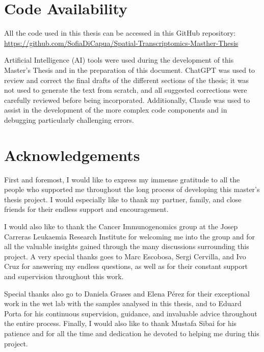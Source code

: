 \section{Code Availability}
All the code used in this thesis can be accessed in this GitHub repository:
\url{https://github.com/SofiaDiCapua/Spatial-Transcriptomics-Masther-Thesis}

Artificial Intelligence (AI) tools were used during the development of this Master’s Thesis and in the preparation of this document. ChatGPT was used to review and correct the final drafts of the different sections of the thesis; it was not used to generate the text from scratch, and all suggested corrections were carefully reviewed before being incorporated. Additionally, Claude was used to assist in the development of the more complex code components and in debugging particularly challenging errors.

\section{Acknowledgements}
First and foremost, I would like to express my immense gratitude to all the people who supported me throughout the long process of developing this master's thesis project. I would especially like to thank my partner, family, and close friends for their endless support and encouragement.

I would also like to thank the Cancer Immunogenomics group at the Josep Carreras Leukaemia Research Institute for welcoming me into the group and for all the valuable insights gained through the many discussions surrounding this project. A very special thanks goes to Marc Escobosa, Sergi Cervilla, and Ivo Cruz for answering my endless questions, as well as for their constant support and supervision throughout this work.

Special thanks also go to Daniela Grases and Elena Pérez for their exceptional work in the wet lab with the samples analysed in this thesis, and to Eduard Porta for his continuous supervision, guidance, and invaluable advice throughout the entire process. Finally, I would also like to thank Mustafa Sibai for his patience and for all the time and dedication he devoted to helping me during this project.



